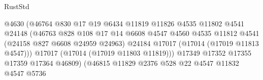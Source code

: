 \begin{lexlean}{RustStd}
\begin{coremodule}
                                                  @4630
                                                  (@46764
                                                    @830
                                                    @17
                                                    @19
                                                    @6434
                                                    @11819
                                                    @11826
                                                    @4535
                                                    @11802
                                                    @4541
                                                    @24148
                                                    (@46763
                                                      @828
                                                      @108
                                                      @17
                                                      @14
                                                      @6608
                                                      @4547
                                                      @4560
                                                      @4535
                                                      @11812
                                                      @4541
                                                      (@24158 @827 @6608 @24959 @24963)
                                                      @24184
                                                      @17017
                                                      (@17014 (@17019 @11813 @4547)))
                                                    @17017
                                                    (@17014 (@17019 @11803 @11819)))
                                                  @17349
                                                  @17352
                                                  @17355
                                                  @17359
                                                  @17364
                                                  @46809)
                                                (@46815
                                                  @11829
                                                  @2376
                                                  @528
                                                  @22
                                                  @4547
                                                  @11832
                                                  @4547
                                                  @5736

\end{coremodule}
\end{lexlean}
